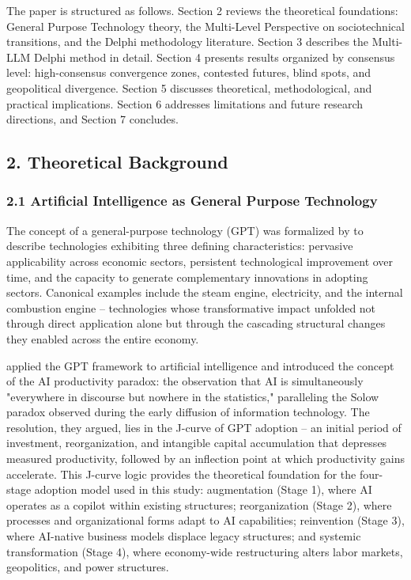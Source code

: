 \documentclass{article}
\begin{document}
The paper is structured as follows. Section 2 reviews the theoretical foundations: General Purpose Technology theory, the Multi-Level Perspective on sociotechnical transitions, and the Delphi methodology literature. Section 3 describes the Multi-LLM Delphi method in detail. Section 4 presents results organized by consensus level: high-consensus convergence zones, contested futures, blind spots, and geopolitical divergence. Section 5 discusses theoretical, methodological, and practical implications. Section 6 addresses limitations and future research directions, and Section 7 concludes.



\subsection{2. Theoretical Background}
\label{sec:2_theoretical_background}


\subsubsection{2.1 Artificial Intelligence as General Purpose Technology}
\label{sec:2_1_artificial_intelligence_as_general_purpose_technology}

The concept of a general-purpose technology (GPT) was formalized by \citet{bresnahan1995gpt} to describe technologies exhibiting three defining characteristics: pervasive applicability across economic sectors, persistent technological improvement over time, and the capacity to generate complementary innovations in adopting sectors. Canonical examples include the steam engine, electricity, and the internal combustion engine -- technologies whose transformative impact unfolded not through direct application alone but through the cascading structural changes they enabled across the entire economy.

\citet{brynjolfsson2017productivity} applied the GPT framework to artificial intelligence and introduced the concept of the AI productivity paradox: the observation that AI is simultaneously "everywhere in discourse but nowhere in the statistics," paralleling the Solow paradox observed during the early diffusion of information technology. The resolution, they argued, lies in the J-curve of GPT adoption -- an initial period of investment, reorganization, and intangible capital accumulation that depresses measured productivity, followed by an inflection point at which productivity gains accelerate. This J-curve logic provides the theoretical foundation for the four-stage adoption model used in this study: augmentation (Stage 1), where AI operates as a copilot within existing structures; reorganization (Stage 2), where processes and organizational forms adapt to AI capabilities; reinvention (Stage 3), where AI-native business models displace legacy structures; and systemic transformation (Stage 4), where economy-wide restructuring alters labor markets, geopolitics, and power structures.
\end{document}
